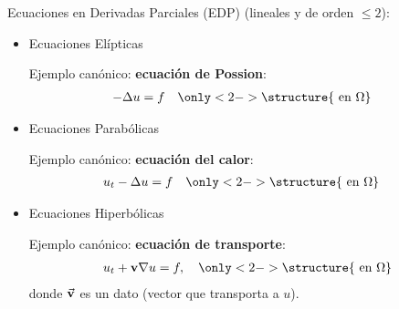 \documentclass[9pt, dvipsnames,]{beamer}
\begin{document}
\begin{frame}{Ecuaciones en Derivadas Parciales (EDP)}
   (lineales y de orden $\le 2$):
  \begin{itemize}
  \item Ecuaciones \alert{Elípticas}
      \par\quad Ejemplo canónico: \textbf{ecuación de Possion}:
      \begin{align*}
        -\Delta u &= f \quad \only<2->{\structure{\text{ en  } \Omega}}
      \end{align*}
  \item Ecuaciones \alert{Parabólicas}
      \par\quad Ejemplo canónico: \textbf{ecuación del calor}:
      \begin{align*}
        u_t - \Delta u &= f \quad \only<2->{\structure{\text{ en  } \Omega}}
      \end{align*}
  \item Ecuaciones  \alert{Hiperbólicas}
    \par\quad Ejemplo canónico: \textbf{ecuación de transporte}:
      \begin{align*}
        u_t + \mathbf{v} \grad u = f,
        \quad \only<2->{\structure{\text{ en  } \Omega}}
      \end{align*}
      \quad donde $\vec{\mathbf{v}}$ es un dato (vector que transporta a $u$).
  \end{itemize}
  \medskip
\end{frame}
\end{document}
